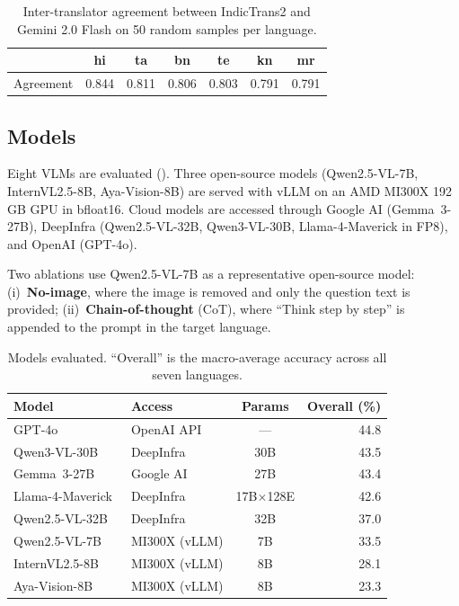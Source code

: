 \documentclass[11pt,a4paper]{article}
\begin{document}
\begin{table}[t]
\centering
\small
\caption{Inter-translator agreement between IndicTrans2 and Gemini 2.0 Flash on 50 random samples per language.}
\label{tab:translation}
\begin{tabular}{@{}lcccccc@{}}
\toprule
& hi & ta & bn & te & kn & mr \\
\midrule
Agreement & 0.844 & 0.811 & 0.806 & 0.803 & 0.791 & 0.791 \\
\bottomrule
\end{tabular}
\end{table}

\subsection{Models}

Eight VLMs are evaluated ().
Three open-source models (Qwen2.5-VL-7B, InternVL2.5-8B, Aya-Vision-8B) are served with vLLM on an AMD MI300X 192\,GB GPU in bfloat16.
Cloud models are accessed through Google AI (Gemma~3-27B), DeepInfra (Qwen2.5-VL-32B, Qwen3-VL-30B, Llama-4-Maverick in FP8), and OpenAI (GPT-4o).

Two ablations use Qwen2.5-VL-7B as a representative open-source model:
(i)~\textbf{No-image}, where the image is removed and only the question text is provided;
(ii)~\textbf{Chain-of-thought} (CoT), where ``Think step by step'' is appended to the prompt in the target language.

\begin{table}[t]
\centering
\small
\caption{Models evaluated. ``Overall'' is the macro-average accuracy across all seven languages.}
\label{tab:models}
\begin{tabular}{@{}llcr@{}}
\toprule
\textbf{Model} & \textbf{Access} & \textbf{Params} & \textbf{Overall (\%)} \\
\midrule
GPT-4o~\citep{openai2024gpt4o} & OpenAI API & --- & 44.8 \\
Qwen3-VL-30B~\citep{bai2025qwen3vl} & DeepInfra & 30B & 43.5 \\
Gemma~3-27B~\citep{google2025gemma3} & Google AI & 27B & 43.4 \\
Llama-4-Maverick~\citep{meta2025llama4} & DeepInfra & 17B$\times$128E & 42.6 \\
Qwen2.5-VL-32B~\citep{bai2025qwen25vl} & DeepInfra & 32B & 37.0 \\
Qwen2.5-VL-7B~\citep{bai2025qwen25vl} & MI300X (vLLM) & 7B & 33.5 \\
InternVL2.5-8B~\citep{chen2024internvl} & MI300X (vLLM) & 8B & 28.1 \\
Aya-Vision-8B~\citep{dash2025ayavision} & MI300X (vLLM) & 8B & 23.3 \\
\bottomrule
\end{tabular}
\end{table}
\end{document}

